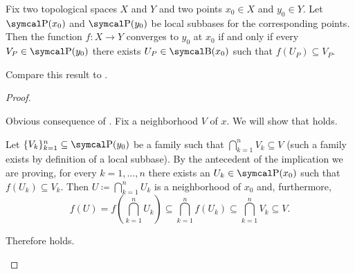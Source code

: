\begin{proposition}\label{thm:cauchy_function_convergence_via_subbases}
  Fix two topological spaces \( X \) and \( Y \) and two points \( x_0 \in X \) and \( y_0 \in Y \). Let \( \CP(x_0) \) and \( \CP(y_0) \) be local subbases for the corresponding points. Then the function \( f: X \to Y \) converges to \( y_0 \) at \( x_0 \) if and only if every \( V_P \in \CP(y_0) \) there exists \( U_P \in \CB(x_0) \) such that \( f(U_P) \subseteq V_P \).

  Compare this result to .
\end{proposition}
\begin{proof}
  \begin{description}
    \Implies Obvious consequence of .
    \ImpliedBy Fix a neighborhood \( V \) of \( x \). We will show that  holds.

    Let \( \{ V_k \}_{k=1}^n \subseteq \CP(y_0) \) be a family such that \( \bigcap_{k=1}^n V_k \subseteq V \) (such a family exists by definition of a local subbase). By the antecedent of the implication we are proving, for every \( k = 1, \ldots, n \) there exists an \( U_k \in \CP(x_0) \) such that \( f(U_k) \subseteq V_k \). Then \( U \coloneqq \bigcap_{k=1}^n U_k \) is a neighborhood of \( x_0 \) and, furthermore,
    \begin{equation*}
      f(U)
      =
      f\left(\bigcap_{k=1}^n U_k \right)
      \subseteq
      \bigcap_{k=1}^n f(U_k)
      \subseteq
      \bigcap_{k=1}^n V_k
      \subseteq
      V.
    \end{equation*}

    Therefore  holds.
  \end{description}
\end{proof}
